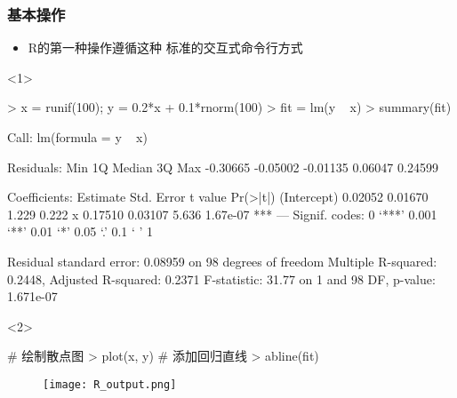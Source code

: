 \subsubsection{基本操作}
\begin{frame}[t, fragile]{\subsecname}{\subsubsecname}
\begin{itemize}
  \item R的第一种操作遵循这种
             标准的交互式命令行方式  
\end{itemize} 

\begin{overlayarea}{\textwidth}{\textheight}
\begin{onlyenv}<1>
\begin{rcode}
> x = runif(100); y = 0.2*x + 0.1*rnorm(100)
> fit = lm(y ~ x)
> summary(fit)

Call:
lm(formula = y ~ x)

Residuals:
     Min       1Q   Median       3Q      Max 
-0.30665 -0.05002 -0.01135  0.06047  0.24599 

Coefficients:
            Estimate Std. Error t value Pr(>|t|)    
(Intercept)  0.02052    0.01670   1.229    0.222    
x            0.17510    0.03107   5.636 1.67e-07 ***
---
Signif. codes:  0 ‘***’ 0.001 ‘**’ 0.01 ‘*’ 0.05 ‘.’ 0.1 ‘ ’ 1

Residual standard error: 0.08959 on 98 degrees of freedom
Multiple R-squared:  0.2448,    Adjusted R-squared:  0.2371 
F-statistic: 31.77 on 1 and 98 DF,  p-value: 1.671e-07
\end{rcode}
\end{onlyenv}

\begin{onlyenv}<2>
\begin{rcode}
# 绘制散点图
> plot(x, y)
# 添加回归直线
> abline(fit)
\end{rcode}
\begin{figure}
    \centering
    \texttt{[image: R\_output.png]}
\end{figure}
\end{onlyenv}
\end{overlayarea}
\end{frame}

